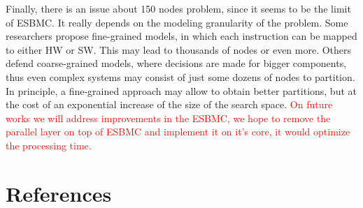 Finally, there is an issue about 150 nodes problem, since it seems to be the limit of ESBMC. It really depends on the modeling granularity of the problem. Some researchers propose fine-grained models, in which each instruction can be mapped to either HW or SW. This may lead to thousands of nodes or even more. Others defend coarse-grained models, where decisions are made for bigger components, thus even complex systems may consist of just some dozens of nodes to partition. In principle, a fine-grained approach may allow to obtain better partitions, but at the cost of an exponential increase of the size of the search space. \textcolor{Red}{On future works we will address improvements in the ESBMC, we hope to remove the parallel layer on top of ESBMC and implement it on it's core, it would optimize the processing time.}
\section{References}

